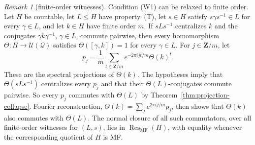 \documentclass[11pt]{amsart}
\newcommand{\leanverified}[2]{\ignorespaces}
\theoremstyle{definition}
\theoremstyle{remark}
\newtheorem{remark}[theorem]{Remark}
\theoremstyle{plain}
\newcommand{\U}{\mathcal U}
\begin{document}
\begin{remark}[finite-order witnesses]\label{rem:torsion-collapse}
Condition (W1) can be relaxed to finite order.  Let $H$ be countable,
let $L\le H$ have property~\textup{(T)}, let $s\in H$ satisfy
$s\gamma s^{-1}\in L$ for every $\gamma\in L$, and let $k\in H$ have
finite order $m$.  If $sLs^{-1}$ centralizes $k$ and the conjugates
$\gamma k\gamma^{-1}$, $\gamma\in L$, commute pairwise, then every
homomorphism $\Theta\colon H\to\U(\mathcal Q)$ satisfies
$\Theta([\gamma,k])=1$ for every $\gamma\in L$.  For
$j\in\mathbf{Z}/m$, let
\[
 p_j=\frac1m\sum_{t\in\mathbf{Z}/m}
 e^{-2\pi ijt/m}\Theta(k)^t.
\]
These are the spectral projections of $\Theta(k)$.  The hypotheses
imply that $\Theta(sLs^{-1})$ centralizes every $p_j$ and that their
$\Theta(L)$-conjugates commute pairwise.  So every $p_j$ commutes with $\Theta(L)$ by
Theorem~\ref{thm:projection-collapse}.  Fourier
reconstruction,
$\Theta(k)=\sum_j e^{2\pi ij/m}p_j$, then shows that $\Theta(k)$ also
commutes with $\Theta(L)$.  The normal closure of all such commutators,
over all finite-order witnesses for $(L,s)$, lies in
$\operatorname{Res}_{\mathrm{MF}}(H)$, with equality whenever the
corresponding quotient of $H$ is MF\@.
\leanverified{Sofic/TorsionSpectralCollapse}{GroupApproximation.TorsionSpectralCollapse.actualCoronaMFInvisible_of_torsionWitness}
\leanverified{Sofic/TorsionSpectralCollapse}{GroupApproximation.TorsionSpectralCollapse.torsionCollapseDefect_le_actualCoronaMFResidual_of_kazhdan}
\leanverified{Sofic/TorsionSpectralCollapse}{GroupApproximation.TorsionSpectralCollapse.actualCoronaMFResidual_eq_torsionCollapseDefect_of_kazhdan}
\end{remark}
\end{document}
